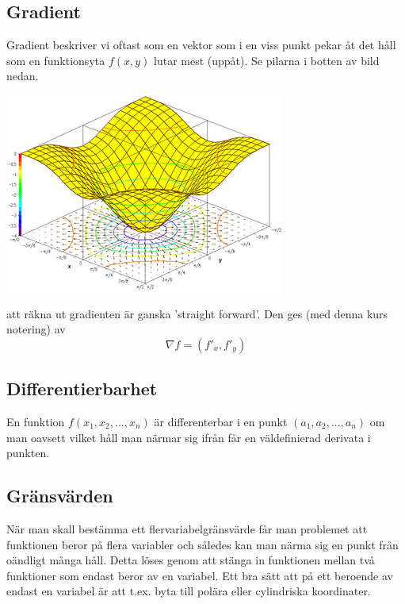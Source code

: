 \documentclass[10pt,a4paper]{article}
\begin{document}
\subsection{Gradient}
Gradient beskriver vi oftast som en vektor som i en viss punkt pekar åt det håll som en funktionsyta $f(x,y)$ lutar mest (uppåt). Se pilarna i botten av bild nedan.
\begin{center}
\includegraphics[scale=0.5]{gradient}
\end{center}
att räkna ut gradienten är ganska 'straight forward'. Den ges (med denna kurs notering) av
\begin{equation}
\nabla f = (f'_x,f'_y)
\end{equation}

\subsection{Differentierbarhet}
En funktion $f(x_1,x_2,...,x_n)$ är differenterbar i en punkt $(a_1,a_2,...,a_n)$ om man oavsett vilket håll man närmar sig ifrån får en väldefinierad derivata i punkten.

\subsection{Gränsvärden}
När man skall bestämma ett flervariabelgränsvärde får man problemet att funktionen beror på flera variabler och således kan man närma sig en punkt från oändligt många håll. Detta löses genom att stänga in funktionen mellan två funktioner som endast beror av en variabel. Ett bra sätt att på ett beroende av endast en variabel är att t.ex. byta till polära eller cylindriska koordinater.
\end{document}
